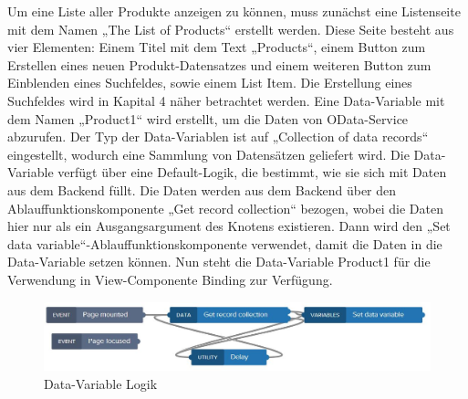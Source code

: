 Um eine Liste aller Produkte anzeigen zu können, muss zunächst eine Listenseite mit dem Namen „The List of Products“ erstellt werden. Diese Seite besteht aus vier Elementen: Einem Titel mit dem Text „Products“, einem Button zum Erstellen eines neuen Produkt-Datensatzes und einem weiteren Button zum Einblenden eines Suchfeldes, sowie einem List Item. Die Erstellung eines Suchfeldes wird in Kapital 4 näher betrachtet werden. Eine Data-Variable mit dem Namen „Product1“ wird erstellt, um die Daten von OData-Service abzurufen. Der Typ der Data-Variablen ist auf „Collection of data records“ eingestellt, wodurch eine Sammlung von Datensätzen geliefert wird. Die Data-Variable verfügt über eine Default-Logik, die bestimmt, wie sie sich mit Daten aus dem Backend füllt. Die Daten werden aus dem Backend über den Ablauffunktionskomponente „Get record collection“ bezogen, wobei die Daten hier nur als ein Ausgangsargument des Knotens existieren. Dann wird den „Set data variable“-Ablauffunktionskomponente verwendet, damit die Daten in die Data-Variable setzen können. Nun steht die Data-Variable Product1 für die Verwendung in View-Componente Binding zur Verfügung.

\begin{figure}[htbp]
 \centering
 \includegraphics[width=1.0\textwidth]{Bilder/appgyver/3_12_Data_Variable_Logik.jpg}
 \caption{Data-Variable Logik}
\end{figure}







